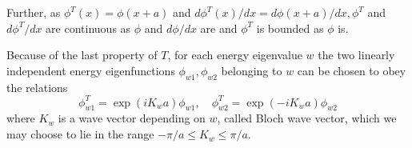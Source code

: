 \documentclass{article}
\begin{document}
Further, as $\phi^{T}(x)=\phi(x+a)$ and $d \phi^{T}(x) / d x=d \phi(x+a) / d x, \phi^{T}$ and $d \phi^{T} / d x$ are continuous as $\phi$ and $d \phi / d x$ are and $\phi^{T}$ is bounded as $\phi$ is.

Because of the last property of $T$, for each energy eigenvalue $w$ the two linearly independent energy eigenfunctions $\phi_{w 1}, \phi_{w 2}$ belonging to $w$ can be chosen to obey the relations
$$
\begin{equation*}
\phi_{w 1}^{T}=\exp \left(i K_{w} a\right) \phi_{w 1}, \quad \phi_{w 2}^{T}=\exp \left(-i K_{w} a\right) \phi_{w 2} \tag{4.9.8}
\end{equation*}
$$
where $K_{w}$ is a wave vector depending on $w$, called Bloch wave vector, which we may choose to lie in the range $-\pi / a \leq K_{w} \leq \pi / a$.
\end{document}
